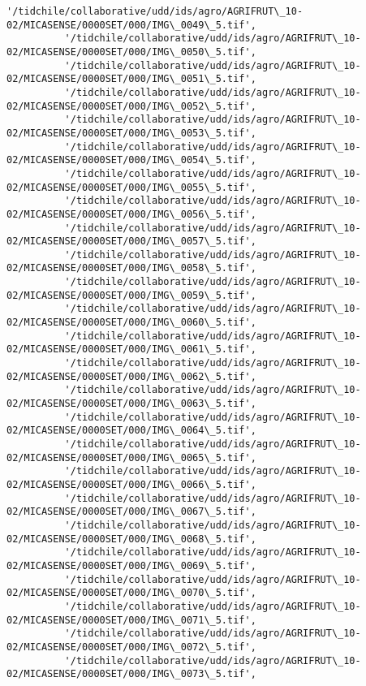\documentclass[11pt]{article}
\begin{document}
\begin{Verbatim}[commandchars=\\\{\}]
          '/tidchile/collaborative/udd/ids/agro/AGRIFRUT\_10-02/MICASENSE/0000SET/000/IMG\_0049\_5.tif',
          '/tidchile/collaborative/udd/ids/agro/AGRIFRUT\_10-02/MICASENSE/0000SET/000/IMG\_0050\_5.tif',
          '/tidchile/collaborative/udd/ids/agro/AGRIFRUT\_10-02/MICASENSE/0000SET/000/IMG\_0051\_5.tif',
          '/tidchile/collaborative/udd/ids/agro/AGRIFRUT\_10-02/MICASENSE/0000SET/000/IMG\_0052\_5.tif',
          '/tidchile/collaborative/udd/ids/agro/AGRIFRUT\_10-02/MICASENSE/0000SET/000/IMG\_0053\_5.tif',
          '/tidchile/collaborative/udd/ids/agro/AGRIFRUT\_10-02/MICASENSE/0000SET/000/IMG\_0054\_5.tif',
          '/tidchile/collaborative/udd/ids/agro/AGRIFRUT\_10-02/MICASENSE/0000SET/000/IMG\_0055\_5.tif',
          '/tidchile/collaborative/udd/ids/agro/AGRIFRUT\_10-02/MICASENSE/0000SET/000/IMG\_0056\_5.tif',
          '/tidchile/collaborative/udd/ids/agro/AGRIFRUT\_10-02/MICASENSE/0000SET/000/IMG\_0057\_5.tif',
          '/tidchile/collaborative/udd/ids/agro/AGRIFRUT\_10-02/MICASENSE/0000SET/000/IMG\_0058\_5.tif',
          '/tidchile/collaborative/udd/ids/agro/AGRIFRUT\_10-02/MICASENSE/0000SET/000/IMG\_0059\_5.tif',
          '/tidchile/collaborative/udd/ids/agro/AGRIFRUT\_10-02/MICASENSE/0000SET/000/IMG\_0060\_5.tif',
          '/tidchile/collaborative/udd/ids/agro/AGRIFRUT\_10-02/MICASENSE/0000SET/000/IMG\_0061\_5.tif',
          '/tidchile/collaborative/udd/ids/agro/AGRIFRUT\_10-02/MICASENSE/0000SET/000/IMG\_0062\_5.tif',
          '/tidchile/collaborative/udd/ids/agro/AGRIFRUT\_10-02/MICASENSE/0000SET/000/IMG\_0063\_5.tif',
          '/tidchile/collaborative/udd/ids/agro/AGRIFRUT\_10-02/MICASENSE/0000SET/000/IMG\_0064\_5.tif',
          '/tidchile/collaborative/udd/ids/agro/AGRIFRUT\_10-02/MICASENSE/0000SET/000/IMG\_0065\_5.tif',
          '/tidchile/collaborative/udd/ids/agro/AGRIFRUT\_10-02/MICASENSE/0000SET/000/IMG\_0066\_5.tif',
          '/tidchile/collaborative/udd/ids/agro/AGRIFRUT\_10-02/MICASENSE/0000SET/000/IMG\_0067\_5.tif',
          '/tidchile/collaborative/udd/ids/agro/AGRIFRUT\_10-02/MICASENSE/0000SET/000/IMG\_0068\_5.tif',
          '/tidchile/collaborative/udd/ids/agro/AGRIFRUT\_10-02/MICASENSE/0000SET/000/IMG\_0069\_5.tif',
          '/tidchile/collaborative/udd/ids/agro/AGRIFRUT\_10-02/MICASENSE/0000SET/000/IMG\_0070\_5.tif',
          '/tidchile/collaborative/udd/ids/agro/AGRIFRUT\_10-02/MICASENSE/0000SET/000/IMG\_0071\_5.tif',
          '/tidchile/collaborative/udd/ids/agro/AGRIFRUT\_10-02/MICASENSE/0000SET/000/IMG\_0072\_5.tif',
          '/tidchile/collaborative/udd/ids/agro/AGRIFRUT\_10-02/MICASENSE/0000SET/000/IMG\_0073\_5.tif',

\end{Verbatim}
\end{document}
